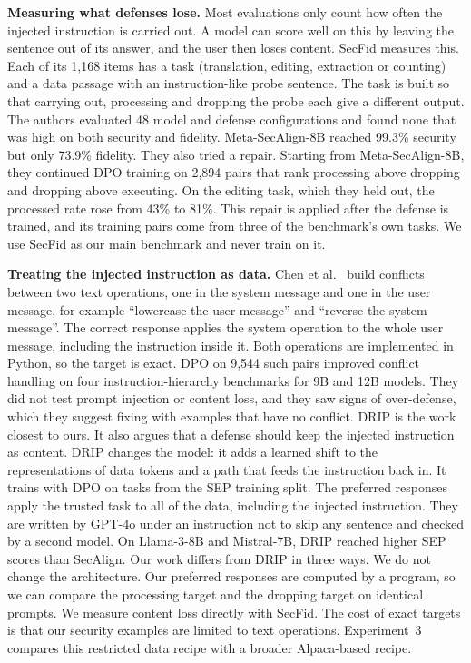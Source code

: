 \documentclass{article}
\begin{document}
\textbf{Measuring what defenses lose.} Most evaluations only count how often the injected instruction is carried out. A model can score well on this by leaving the sentence out of its answer, and the user then loses content. SecFid \cite{secfid} measures this. Each of its 1,168 items has a task (translation, editing, extraction or counting) and a data passage with an instruction-like probe sentence. The task is built so that carrying out, processing and dropping the probe each give a different output. The authors evaluated 48 model and defense configurations and found none that was high on both security and fidelity. Meta-SecAlign-8B reached 99.3\% security but only 73.9\% fidelity. They also tried a repair. Starting from Meta-SecAlign-8B, they continued DPO training on 2,894 pairs that rank processing above dropping and dropping above executing. On the editing task, which they held out, the processed rate rose from 43\% to 81\%. This repair is applied after the defense is trained, and its training pairs come from three of the benchmark's own tasks. We use SecFid as our main benchmark and never train on it.

\textbf{Treating the injected instruction as data.} Chen et al.\ \cite{goalgoal} build conflicts between two text operations, one in the system message and one in the user message, for example ``lowercase the user message'' and ``reverse the system message''. The correct response applies the system operation to the whole user message, including the instruction inside it. Both operations are implemented in Python, so the target is exact. DPO on 9,544 such pairs improved conflict handling on four instruction-hierarchy benchmarks for 9B and 12B models. They did not test prompt injection or content loss, and they saw signs of over-defense, which they suggest fixing with examples that have no conflict. DRIP \cite{drip} is the work closest to ours. It also argues that a defense should keep the injected instruction as content. DRIP changes the model: it adds a learned shift to the representations of data tokens and a path that feeds the instruction back in. It trains with DPO on tasks from the SEP training split. The preferred responses apply the trusted task to all of the data, including the injected instruction. They are written by GPT-4o under an instruction not to skip any sentence and checked by a second model. On Llama-3-8B and Mistral-7B, DRIP reached higher SEP scores than SecAlign. Our work differs from DRIP in three ways. We do not change the architecture. Our preferred responses are computed by a program, so we can compare the processing target and the dropping target on identical prompts. We measure content loss directly with SecFid. The cost of exact targets is that our security examples are limited to text operations. Experiment~3 compares this restricted data recipe with a broader Alpaca-based recipe.
\end{document}

